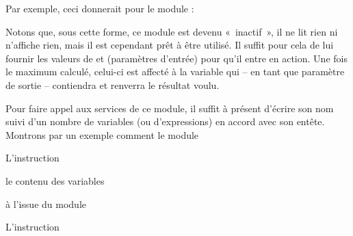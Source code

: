 	Par exemple, ceci donnerait pour le module  :


	Notons que, sous cette forme, ce module est devenu «~inactif~», il ne
	lit rien ni n'affiche rien, mais il est cependant prêt à être utilisé. Il
	suffit pour cela de lui fournir les valeurs de  et
	 (paramètres d’entrée) pour qu’il entre en action.
	Une fois le maximum calculé, celui-ci est affecté à la variable
	 qui – en tant que paramètre de sortie –
	contiendra et renverra le résultat voulu.

	{Pour faire appel aux services de ce module, il
	suffit à présent d’écrire son nom suivi d’un nombre de variables (ou
	d'expressions) en accord avec son entête. Montrons par
	un exemple comment le module
	}


	{
	{L’instruction
	}}
	
	\begin{liste}
	\item {
	{le contenu des variables
	}}
	\item {
	{à l’issue du module
	}}
	\end{liste}

	{
	{L’instruction
	}}
	
